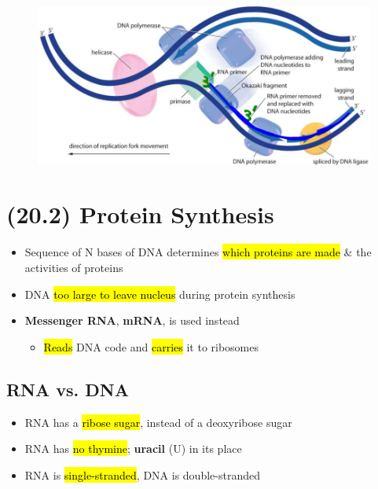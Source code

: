 \documentclass[a4paper,12pt]{article}
\begin{document}
\begin{figure}[H]
    \centering
    \includegraphics[width=\textwidth]{split}
\end{figure}

\pagebreak

\section{(20.2) Protein Synthesis}
\begin{itemize}
    \item{Sequence of N bases of DNA determines \hl{which proteins are made} \& the activities of proteins}
    \item{DNA \hl{too large to leave nucleus} during protein synthesis}
    \item{
            \textbf{Messenger RNA}, \textbf{mRNA}, is used instead
            \begin{itemize}
                \item{\hl{Reads} DNA code and \hl{carries} it to ribosomes}
            \end{itemize}
        }
\end{itemize}

\subsection{RNA vs. DNA}
\begin{itemize}
    \item{RNA has a \hl{ribose sugar}, instead of a deoxyribose sugar}
    \item{RNA has \hl{no thymine}; \textbf{uracil} (U) in its place}
    \item{RNA is \hl{single-stranded}, DNA is double-stranded}
\end{itemize}
\end{document}
